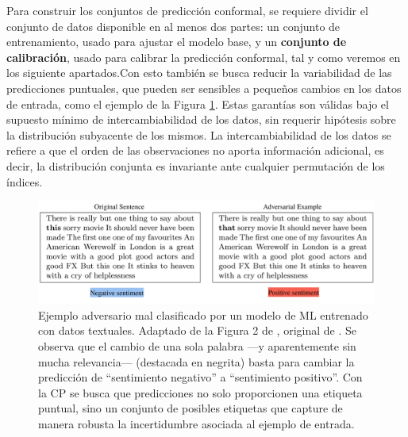 Para construir los conjuntos de predicción conformal, se requiere dividir el conjunto de datos disponible en al menos dos partes: un conjunto de entrenamiento, usado para ajustar el modelo base, y un \textbf{conjunto de calibración}, usado para calibrar la predicción conformal, tal y como veremos en los siguiente apartados.Con esto también se busca reducir la variabilidad de las predicciones puntuales, que pueden ser sensibles a pequeños cambios en los datos de entrada, como el ejemplo de la Figura \ref{fig:adversarial_example}. Estas garantías son válidas bajo el supuesto mínimo de intercambiabilidad de los datos, sin requerir hipótesis sobre la distribución subyacente de los mismos. La intercambiabilidad de los datos se refiere a que el orden de las observaciones no aporta información adicional, es decir, la distribución conjunta es invariante ante cualquier permutación de los índices. 

\begin{figure}[htbp]
    \centering
    \includegraphics[width=\textwidth]{capitulos/cap_02/imagenes/adversarial_example.png}
    \caption[
        Ejemplo adversario mal clasificado por un modelo de ML entrenado con datos textuales.
        Adaptado de la Figura 2 de \cite{hullermeier2021}, original de \cite{sato2018}.
    ]{
        Ejemplo adversario mal clasificado por un modelo de \acrshort{ML} entrenado con datos textuales.
        Adaptado de la Figura 2 de \cite{hullermeier2021}, original de \cite{sato2018}.
        Se observa que el cambio de una sola palabra ---y aparentemente sin mucha relevancia--- (destacada en negrita) basta para cambiar la predicción de ``sentimiento negativo'' a ``sentimiento positivo''.
        Con la \acrshort{CP} se busca que predicciones no solo proporcionen una etiqueta puntual, sino un conjunto de posibles etiquetas que capture de manera robusta la incertidumbre asociada al ejemplo de entrada.
    } 
    \label{fig:adversarial_example}
\end{figure}


